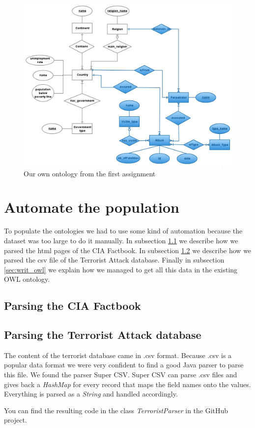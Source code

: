 \documentclass{article}
\begin{document}
\begin{figure}
\includegraphics[width=1\textwidth]{TerroristAttacks.jpg}
\caption{Our own ontology from the first assignment}
\label{fig:ontology}
\end{figure}
\section{Automate the population}
To populate the ontologies we had to use some kind of automation because the dataset was too large to do it manually. In subsection \ref{sec:factbook} we describe how we parsed the html pages of the CIA Factbook. In subsection \ref{sec:terrorist_db} we describe how we parsed the csv file of the Terrorist Attack database. Finally in subsection \ref{sec:writ_owl} we explain how we managed to get all this data in the existing OWL ontology.
\subsection{Parsing the CIA Factbook}
\label{sec:factbook}
\subsection{Parsing the Terrorist Attack database}
\label{sec:terrorist_db}
The content of the terrorist database came in .csv format. Because .csv is a popular data format we were very confident to find a good Java parser to parse this file. We found the parser Super CSV\cite{supercsv}. Super CSV can parse .csv files and gives back a \textit{HashMap} for every record that maps the field names onto the values. Everything is parsed as a \textit{String} and handled accordingly.\par
You can find the resulting code in the class \textit{TerroristParser} in the GitHub project\cite{githubproject}.
\end{document}
